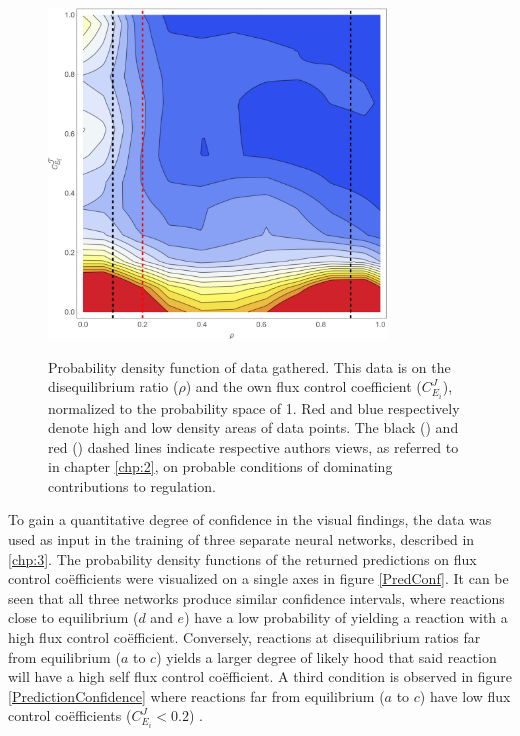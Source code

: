 \begin{figure}[p] 
\includegraphics[width=0.8\textwidth]{figs/LitCompare.png} \label{LitCompare}
\centering
\caption{Probability density function of data gathered. This data is on the disequilibrium ratio ($\rho$) and the own flux control coefficient ($C_{E_i}^J$), normalized to the probability space of 1. Red and blue respectively denote high and low density areas of data points. The black (\citeauthor{Rohwer2009}) and red (\citeauthor{ROLLESTON1972}) dashed lines indicate respective authors views, as referred to in chapter \ref{chp:2}, on probable conditions of dominating contributions to regulation.}
\end{figure}

To gain a quantitative degree of confidence in the visual findings, the data was used as input in the training of three separate neural networks, described in \ref{chp:3}. The probability density functions of the returned predictions on flux control co\"efficients were visualized on a single axes in figure \ref{PredConf}. It can be seen that all three networks produce similar confidence intervals, where reactions close to equilibrium ($d$ and $e$) have a low probability of yielding a reaction with a high flux control co\"efficient. Conversely, reactions at disequilibrium ratios far from equilibrium ($a$ to $c$) yields a larger degree of likely hood that said reaction will have a high self flux control co\"efficient. A third condition is observed in figure \ref{PredictionConfidence} where reactions far from equilibrium ($a$ to $c$) have low flux control co\"efficients ($C_{E_i}^J <0.2$) .

